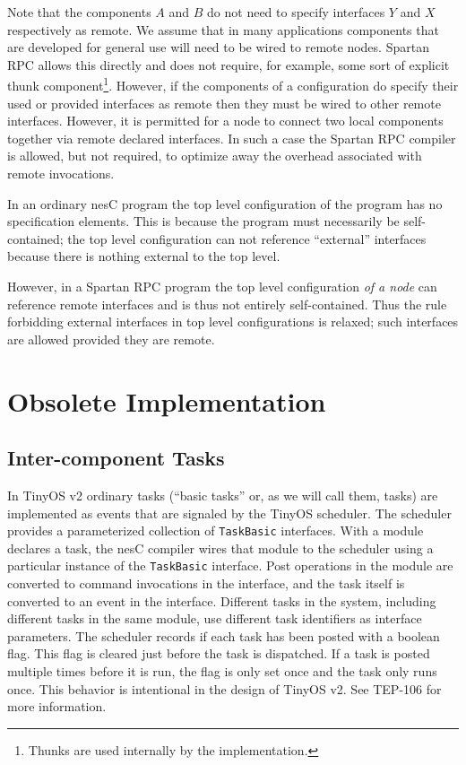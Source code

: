 Note that the components $A$ and $B$ do not need to specify interfaces $Y$ and $X$ respectively
as remote. We assume that in many applications components that are developed for general use
will need to be wired to remote nodes. Spartan RPC allows this directly and does not require,
for example, some sort of explicit thunk component\footnote{Thunks are used internally by the
implementation.}. However, if the components of a configuration do specify their used or
provided interfaces as remote then they must be wired to other remote interfaces. However, it is
permitted for a node to connect two local components together via remote declared interfaces. In
such a case the Spartan RPC compiler is allowed, but not required, to optimize away the
overhead associated with remote invocations.

In an ordinary nesC program the top level configuration of the program has no specification
elements. This is because the program must necessarily be self-contained; the top level
configuration can not reference ``external'' interfaces because there is nothing external to the
top level.

However, in a Spartan RPC program the top level configuration \emph{of a node} can reference
remote interfaces and is thus not entirely self-contained. Thus the rule forbidding external
interfaces in top level configurations is relaxed; such interfaces are allowed provided they are
remote.


\section{Obsolete Implementation}

\subsection{Inter-component Tasks}

In TinyOS v2 ordinary tasks (``basic tasks'' or, as we will call them, 
tasks) are implemented as events that are signaled by the TinyOS scheduler. The scheduler
provides a parameterized collection of \texttt{TaskBasic} interfaces. With a module declares a
task, the nesC compiler wires that module to the scheduler using a particular instance of the
\texttt{TaskBasic} interface. Post operations in the module are converted to command invocations
in the interface, and the task itself is converted to an event in the interface. Different tasks
in the system, including different tasks in the same module, use different task identifiers as
interface parameters. The scheduler records if each task has been posted with a boolean flag.
This flag is cleared just before the task is dispatched. If a task is posted multiple times
before it is run, the flag is only set once and the task only runs once. This behavior is
intentional in the design of TinyOS v2. See TEP-106 for more information.

